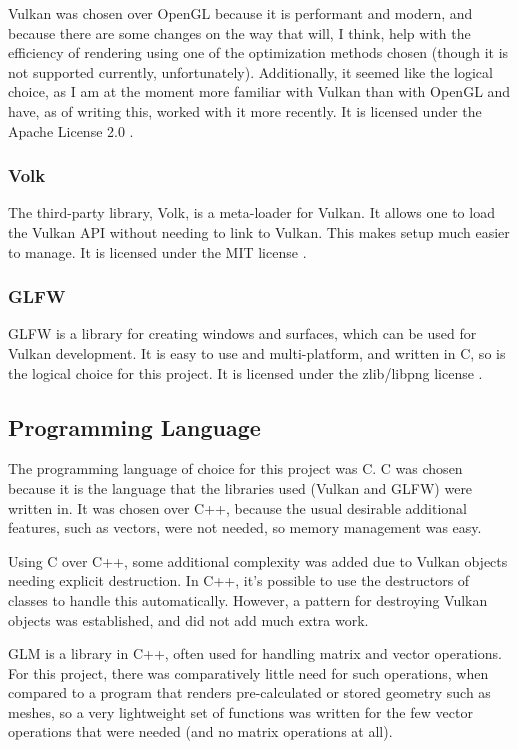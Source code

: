 Vulkan was chosen over OpenGL because it is performant and modern, and because there are some changes on the way that will, I think, help with the efficiency of rendering using one of the optimization methods chosen (though it is not supported currently, unfortunately). Additionally, it seemed like the logical choice, as I am at the moment more familiar with Vulkan than with OpenGL and have, as of writing this, worked with it more recently. It is licensed under the Apache License 2.0 \cite{licensing-vulkan}.

\subsubsection{Volk}

The third-party library, Volk, is a meta-loader for Vulkan. It allows one to load the Vulkan API without needing to link to Vulkan. This makes setup much easier to manage. It is licensed under the MIT license \cite{licensing-volk}.

\subsubsection{GLFW}

GLFW is a library for creating windows and surfaces, which can be used for Vulkan development. It is easy to use and multi-platform, and written in C, so is the logical choice for this project. It is licensed under the zlib/libpng license \cite{licensing-glfw}.

\subsection{Programming Language}

The programming language of choice for this project was C. C was chosen because it is the language that the libraries used (Vulkan and GLFW) were written in. It was chosen over C++, because the usual desirable additional features, such as vectors, were not needed, so memory management was easy.\newline

Using C over C++, some additional complexity was added due to Vulkan objects needing explicit destruction. In C++, it's possible to use the destructors of classes to handle this automatically. However, a pattern for destroying Vulkan objects was established, and did not add much extra work.\newline

GLM is a library in C++, often used for handling matrix and vector operations. For this project, there was comparatively little need for such operations, when compared to a program that renders pre-calculated or stored geometry such as meshes, so a very lightweight set of functions was written for the few vector operations that were needed (and no matrix operations at all).\newline

